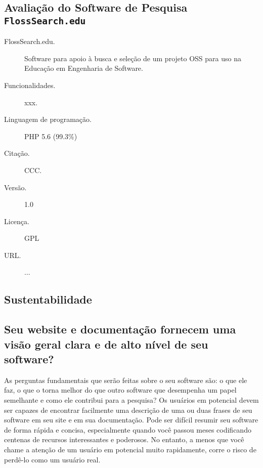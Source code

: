 \subsection{Avaliação do Software de Pesquisa \texttt{FlossSearch.edu} }
\label{section:casesstudy:flosssearch}

\begin{table}[htb]
\begin{tcolorbox}[colback=white,title=Nome do Software]
\begin{description}
    \item [FlossSearch.edu.] Software para apoio à busca e seleção de um projeto OSS para uso na Educação em Engenharia de Software.
    \item[Funcionalidades.] xxx.
    \item[Linguagem de programação.] PHP 5.6 (99.3\%)
    \item[Citação.] CCC.
    \item[Versão.] 1.0
    \item[Licença.] GPL
    \item[URL.] ...
\end{description}
\end{tcolorbox}
\end{table}

\subsection*{Sustentabilidade}

\subsection*{Seu website e documentação fornecem uma visão geral clara e de alto nível de seu software?}

As perguntas fundamentais que serão feitas sobre o seu software são: o que ele faz, o que o torna melhor do que outro software que desempenha um papel semelhante e como ele contribui para a pesquisa?
Os usuários em potencial devem ser capazes de encontrar facilmente uma descrição de uma ou duas frases de seu software em seu site e em sua documentação.
Pode ser difícil resumir seu software de forma rápida e concisa, especialmente quando você passou meses codificando centenas de recursos interessantes e poderosos. No entanto, a menos que você chame a atenção de um usuário em potencial muito rapidamente, corre o risco de perdê-lo como um usuário real.

